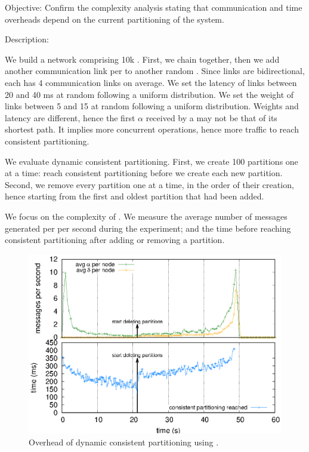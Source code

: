 
\begin{asparadesc}
\item [Objective:] Confirm the complexity analysis stating that
  communication and time overheads depend on the current partitioning
  of the system.
  
\item [Description:]

We build a network comprising 10k \processes. First, we chain
\processes together, then we add another communication link per
\process to another random \process. Since links are bidirectional,
each \process has 4 communication links on average. We set the latency
of links between 20 and 40 ms at random following a uniform
distribution. We set the weight of links between 5 and 15 at random
following a uniform distribution. Weights and latency are different,
hence the first $\alpha$ received by a \process may not be that of its
shortest path. It implies more concurrent operations, hence more
traffic to reach consistent partitioning.

\noindent We evaluate dynamic consistent partitioning. First, we
create 100 partitions one at a time: \processes reach consistent
partitioning before we create each new partition. Second, we remove
every partition one at a time, in the order of their creation, hence
starting from the first and oldest partition that had been added.

\noindent We focus on the complexity of \NAME. We measure the average
number of messages generated per \process per second during the
experiment; and the time before reaching consistent partitioning after
adding or removing a partition.

\begin{figure}
  \centering\includegraphics[width=\FIGSCALE\columnwidth]{img/as_cast_complexity.eps}
  \caption{\label{fig:complexity}Overhead of dynamic consistent partitioning
    using \NAME.}
  

\end{figure}
\end{asparadesc}
